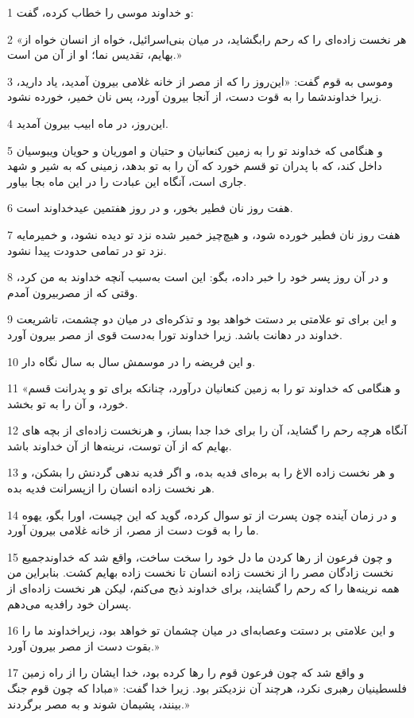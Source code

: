 \par 1 و خداوند موسی را خطاب کرده، گفت:
\par 2 «هر نخست زاده‌ای را که رحم رابگشاید، در میان بنی‌اسرائیل، خواه از انسان خواه از بهایم، تقدیس نما؛ او از آن من است.»
\par 3 وموسی به قوم گفت: «این‌روز را که از مصر از خانه غلامی بیرون آمدید، یاد دارید، زیرا خداوندشما را به قوت دست، از آنجا بیرون آورد، پس نان خمیر، خورده نشود.
\par 4 این‌روز، در ماه ابیب بیرون آمدید.
\par 5 و هنگامی که خداوند تو را به زمین کنعانیان و حتیان و اموریان و حویان ویبوسیان داخل کند، که با پدران تو قسم خورد که آن را به تو بدهد، زمینی که به شیر و شهد جاری است، آنگاه این عبادت را در این ماه بجا بیاور.
\par 6 هفت روز نان فطیر بخور، و در روز هفتمین عیدخداوند است.
\par 7 هفت روز نان فطیر خورده شود، و هیچ‌چیز خمیر شده نزد تو دیده نشود، و خمیرمایه نزد تو در تمامی حدودت پیدا نشود.
\par 8 و در آن روز پسر خود را خبر داده، بگو: این است به‌سبب آنچه خداوند به من کرد، وقتی که از مصربیرون آمدم.
\par 9 و این برای تو علامتی بر دستت خواهد بود و تذکره‌ای در میان دو چشمت، تاشریعت خداوند در دهانت باشد. زیرا خداوند تورا به‌دست قوی از مصر بیرون آورد.
\par 10 و این فریضه را در موسمش سال به سال نگاه دار.
\par 11 «و هنگامی که خداوند تو را به زمین کنعانیان درآورد، چنانکه برای تو و پدرانت قسم خورد، و آن را به تو بخشد.
\par 12 آنگاه هر‌چه رحم را گشاید، آن را برای خدا جدا بساز، و هرنخست زاده‌ای از بچه های بهایم که از آن توست، نرینه‌ها از آن خداوند باشد.
\par 13 و هر نخست زاده الاغ را به بره‌ای فدیه بده، و اگر فدیه ندهی گردنش را بشکن، و هر نخست زاده انسان را ازپسرانت فدیه بده.
\par 14 و در زمان آینده چون پسرت از تو سوال کرده، گوید که این چیست، اورا بگو، یهوه ما را به قوت دست از مصر، از خانه غلامی بیرون آورد.
\par 15 و چون فرعون از رها کردن ما دل خود را سخت ساخت، واقع شد که خداوندجمیع نخست زادگان مصر را از نخست زاده انسان تا نخست زاده بهایم کشت. بنابراین من همه نرینه‌ها را که رحم را گشایند، برای خداوند ذبح می‌کنم، لیکن هر نخست زاده‌ای از پسران خود رافدیه می‌دهم.
\par 16 و این علامتی بر دستت وعصابه‌ای در میان چشمان تو خواهد بود، زیراخداوند ما را بقوت دست از مصر بیرون آورد.»
\par 17 و واقع شد که چون فرعون قوم را رها کرده بود، خدا ایشان را از راه زمین فلسطینیان رهبری نکرد، هرچند آن نزدیکتر بود. زیرا خدا گفت: «مبادا که چون قوم جنگ بینند، پشیمان شوند و به مصر برگردند.»
